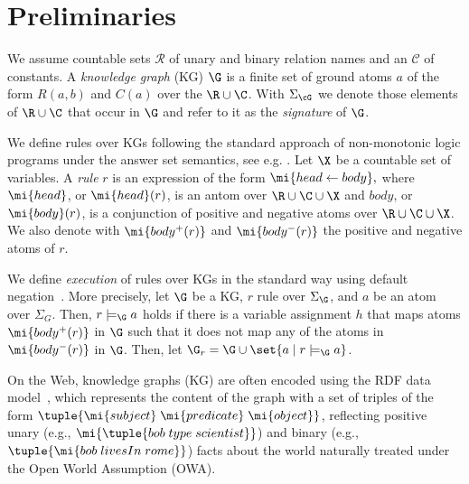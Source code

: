 
\section{Preliminaries}
\label{sec:prelim}

We assume countable sets $\mathcal{R}$ of unary and binary relation 
 names and an $\mathcal{C}$ of constants. 
A \emph{knowledge graph} (KG) $\G$ is a finite set of ground atoms $a$ of the form
$R(a,b)$ and $C(a)$ over the $\R\cup\C$.
With $\Sigma_{\cG}$ we denote those elements of $\R\cup\C$ that occur in $\G$
and refer to it as the \emph{signature} of $\G$.


We define rules over KGs following the standard approach of non-monotonic logic programs under the answer set semantics, see e.g. \cite{GL1988}.
Let $\X$ be a countable set of variables.
A \emph{rule} $r$ is an expression of the form
$
\mi{head \leftarrow body},
$
where $\mi{head}$, or $\mi{head}(r)$, is an antom 
over $\R\cup\C\cup\X$ 
and $body$, or $\mi{body}(r)$, is a conjunction of positive and negative atoms 
over $\R\cup\C\cup\X$.
We also denote with $\mi{body^+(r)}$ and $\mi{body^-(r)}$ the positive and 
negative atoms of $r$.

We define \emph{execution} of rules over KGs in the standard way using default negation~\cite{GL1988}.
More precisely, let $\G$ be a KG, $r$  rule over $\Sigma_\G$, 
and $a$ be an atom over $\Sigma_G$.
Then, $r \models_\G a$ holds if there is a variable assignment $h$ that maps  atoms $\mi{body^+(r)}$ in $\G$ such that it does not map any of the atoms in $\mi{body^-(r)}$ in $\G$. 
Then, let $\G_r = \G \cup \set{a \mid r \models_\G a}$. 


 On the Web, knowledge graphs (KG) are often encoded using the RDF data
model~\cite{rdf}, which represents the content of the graph with a set of
triples of the form $\tuple{\mi{subject}\;\mi{predicate}\;\mi{object}}$, reflecting positive unary (e.g., $\mi{\tuple{bob\;type\;scientist}}$) and binary (e.g., $\tuple{\mi{bob\;livesIn\;rome}}$) facts about the world naturally treated under the Open World Assumption (OWA).  %


